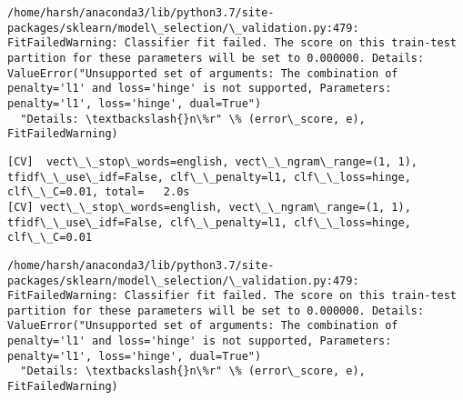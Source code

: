 \documentclass[11pt]{article}
\begin{document}
    \begin{Verbatim}[commandchars=\\\{\}]
/home/harsh/anaconda3/lib/python3.7/site-packages/sklearn/model\_selection/\_validation.py:479: FitFailedWarning: Classifier fit failed. The score on this train-test partition for these parameters will be set to 0.000000. Details: 
ValueError("Unsupported set of arguments: The combination of penalty='l1' and loss='hinge' is not supported, Parameters: penalty='l1', loss='hinge', dual=True")
  "Details: \textbackslash{}n\%r" \% (error\_score, e), FitFailedWarning)

    \end{Verbatim}

    \begin{Verbatim}[commandchars=\\\{\}]
[CV]  vect\_\_stop\_words=english, vect\_\_ngram\_range=(1, 1), tfidf\_\_use\_idf=False, clf\_\_penalty=l1, clf\_\_loss=hinge, clf\_\_C=0.01, total=   2.0s
[CV] vect\_\_stop\_words=english, vect\_\_ngram\_range=(1, 1), tfidf\_\_use\_idf=False, clf\_\_penalty=l1, clf\_\_loss=hinge, clf\_\_C=0.01 

    \end{Verbatim}

    \begin{Verbatim}[commandchars=\\\{\}]
/home/harsh/anaconda3/lib/python3.7/site-packages/sklearn/model\_selection/\_validation.py:479: FitFailedWarning: Classifier fit failed. The score on this train-test partition for these parameters will be set to 0.000000. Details: 
ValueError("Unsupported set of arguments: The combination of penalty='l1' and loss='hinge' is not supported, Parameters: penalty='l1', loss='hinge', dual=True")
  "Details: \textbackslash{}n\%r" \% (error\_score, e), FitFailedWarning)

    \end{Verbatim}
\end{document}
